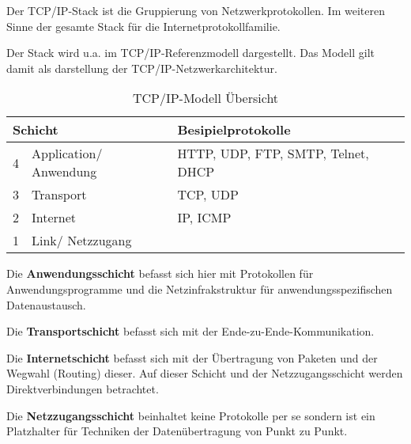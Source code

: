 Der TCP/IP-Stack ist die Gruppierung von Netzwerkprotokollen. Im weiteren Sinne der gesamte Stack für die Internetprotokollfamilie.

Der Stack wird u.a. im TCP/IP-Referenzmodell dargestellt. Das Modell gilt damit als darstellung der TCP/IP-Netzwerkarchitektur.

\begin{table}
    [H]
    \centering
    \begin{tabular}{|l|l|l|}
        \hline
        \multicolumn{2}{|l|}{\textbf{Schicht}} & \textbf{Besipielprotokolle}                                      \\\hline
        4                                      & Application/ Anwendung      & HTTP, UDP, FTP, SMTP, Telnet, DHCP \\\hline
        3                                      & Transport                   & TCP, UDP                           \\\hline
        2                                      & Internet                    & IP, ICMP                           \\\hline
        1                                      & Link/ Netzzugang            & \multicolumn{1}{c}{}               \\\cline{1-2}
    \end{tabular}
    \caption{TCP/IP-Modell Übersicht}
\end{table}

Die \textbf{Anwendungsschicht} befasst sich hier mit Protokollen für Anwendungsprogramme und die Netzinfrakstruktur für anwendungsspezifischen Datenaustausch.

Die \textbf{Transportschicht} befasst sich mit der Ende-zu-Ende-Kommunikation.

Die \textbf{Internetschicht} befasst sich mit der Übertragung von Paketen und der Wegwahl (Routing) dieser. Auf dieser Schicht und der Netzzugangsschicht werden Direktverbindungen betrachtet.

Die \textbf{Netzzugangsschicht} beinhaltet keine Protokolle per se sondern ist ein Platzhalter für Techniken der Datenübertragung von Punkt zu Punkt.